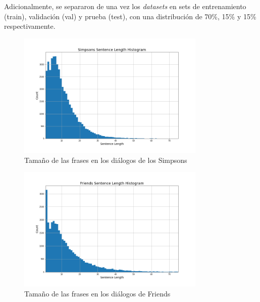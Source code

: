 Adicionalmente, se separaron de una vez los \textit{datasets} en sets de entrenamiento (train), validación (val) y prueba (test), con una distribución de 70\%, 15\% y 15\% respectivamente. 

\begin{figure}[H]
    \centering
    \includegraphics[width=0.8\textwidth]{results/preprocessing/simpsons_hist.png}
    \caption{Tamaño de las frases en los diálogos de los Simpsons}
    \label{fig:simpsons_hist}
\end{figure}



\begin{figure}[H]
    \centering
    \includegraphics[width=0.8\textwidth]{results/preprocessing/friends_hist.png}
    \caption{Tamaño de las frases en los diálogos de Friends}
    \label{fig:friends_hist}
\end{figure}